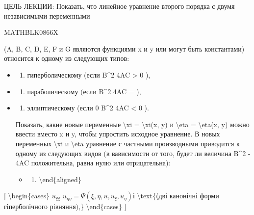\documentclass[
]{article}
\providecommand{\tightlist}{%
  \setlength{\itemsep}{0pt}\setlength{\parskip}{0pt}}
\begin{document}
{{ЦЕЛЬ ЛЕКЦИИ: Показать, что линейное уравнение второго порядка с двумя
независимыми переменными

MATHBLK0866X

(A, B, C, D, E, F и G являются функциями x и y или могут быть
константами) относится к одному из следующих типов:

\begin{itemize}
\item
  \begin{enumerate}
  \def\labelenumi{\arabic{enumi})}
  \tightlist
  \item
    гиперболическому (если B\^{}2 4AC \textgreater{} 0 ),
  \end{enumerate}
\item
  \begin{enumerate}
  \def\labelenumi{\arabic{enumi})}
  \setcounter{enumi}{1}
  \tightlist
  \item
    параболическому (если B\^{}2 4AC = ),
  \end{enumerate}
\item
  \begin{enumerate}
  \def\labelenumi{\arabic{enumi})}
  \setcounter{enumi}{2}
  \tightlist
  \item
    эллиптическому (если 0 B\^{}2 4AC \textless{} 0 ).
  \end{enumerate}

  Показать, какие новые переменные \textbackslash xi =
  \textbackslash xi(x, y) и \textbackslash eta = \textbackslash eta(x,
  y) можно ввести вместо x и y, чтобы упростить исходное уравнение. В
  новых переменных \textbackslash xi и \textbackslash eta уравнение с
  частными производными приводится к одному из следующих видов (в
  вависимости от того, будет ли величина B\^{}2 - 4AC положительна,
  равна нулю или отрицательна):

  \begin{itemize}
  \tightlist
  \item
    \begin{enumerate}
    \def\labelenumi{\arabic{enumi}.}
    \tightlist
    \item
      \textbackslash end\{aligned\}
    \end{enumerate}
  \end{itemize}
\end{itemize}

{[} \textbackslash begin\{cases\} \(u_{\xi\xi}\)
\(u_{\eta\eta} = \Psi(\xi, \eta, u, u_{\xi}, u_{\eta})\)і
\textbackslash text\{(дві канонічні форми гіперболічного рівняння),\}
\textbackslash end\{cases\} {]}

}}
\end{document}
